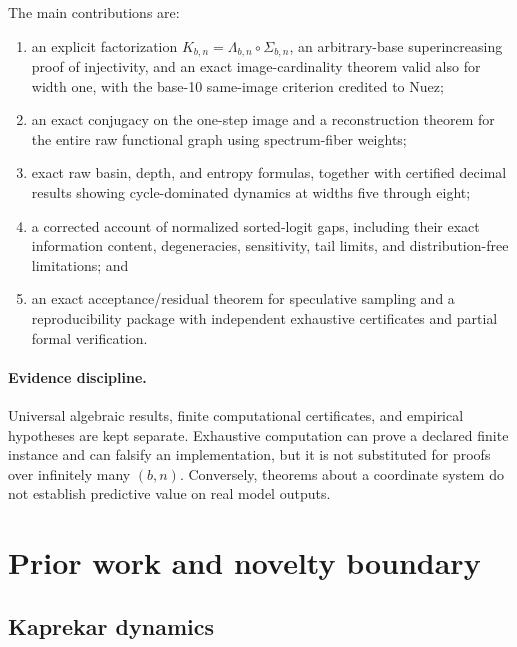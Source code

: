 \documentclass[11pt]{article}
\theoremstyle{definition}
\theoremstyle{remark}
\newcommand{\1}{\mathbf{1}}
\begin{document}
The main contributions are:
\begin{enumerate}[leftmargin=*,itemsep=2pt]
  \item an explicit factorization $K_{b,n}=\Lambda_{b,n}\circ\Sigma_{b,n}$,
        an arbitrary-base superincreasing proof of injectivity, and an exact
        image-cardinality theorem valid also for width one, with the base-10
        same-image criterion credited to Nuez;
  \item an exact conjugacy on the one-step image and a reconstruction theorem
        for the entire raw functional graph using spectrum-fiber weights;
  \item exact raw basin, depth, and entropy formulas, together with certified
        decimal results showing cycle-dominated dynamics at widths five
        through eight;
  \item a corrected account of normalized sorted-logit gaps, including their
        exact information content, degeneracies, sensitivity, tail limits,
        and distribution-free limitations; and
  \item an exact acceptance/residual theorem for speculative sampling and a
        reproducibility package with independent exhaustive certificates and
        partial formal verification.
\end{enumerate}

\paragraph{Evidence discipline.}
Universal algebraic results, finite computational certificates, and empirical
hypotheses are kept separate.  Exhaustive computation can prove a declared
finite instance and can falsify an implementation, but it is not substituted
for proofs over infinitely many $(b,n)$.  Conversely, theorems about a
coordinate system do not establish predictive value on real model outputs.

\section{Prior work and novelty boundary}

\subsection{Kaprekar dynamics}
\end{document}
